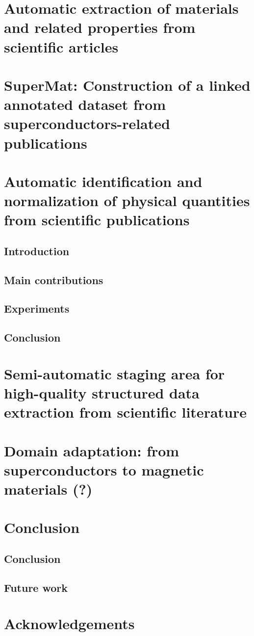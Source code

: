 \documentclass[12pt, a4paper]{report}
\begin{document}
\chapter{Automatic extraction of materials and related properties from scientific articles}

\chapter{SuperMat: Construction of a linked annotated dataset from superconductors-related publications}

\chapter{Automatic identification and normalization of physical quantities from scientific publications}
\section{Introduction}
\section{Main contributions}
\section{Experiments}
\section{Conclusion}

\chapter{Semi-automatic staging area for high-quality structured data extraction from scientific literature}

\chapter{Domain adaptation: from superconductors to magnetic materials (?)}

\chapter{Conclusion}
\section{Conclusion}
\section{Future work}

\chapter*{Acknowledgements}
\newpage



\end{document}
